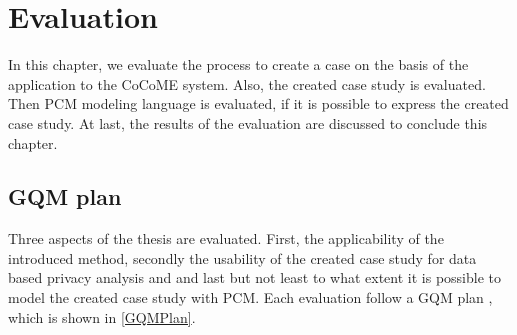 \chapter{Evaluation}
\label{ch:eval}
In this chapter, we evaluate the process to create a case on the basis of the application to the CoCoME system. Also, the created case study is evaluated. Then PCM modeling language is evaluated, if it is possible to express the created case study. At last, the results of the evaluation are discussed to conclude this chapter.
\section{GQM plan}
Three aspects of the thesis are evaluated. First, the applicability of the introduced method, secondly the usability of the created case study for data based privacy analysis and and last but not least to what extent it is possible to model the created case study with PCM. 
 Each evaluation follow a GQM plan \cite{GQM_Intro}, which is shown in \autoref{GQMPlan}. 
